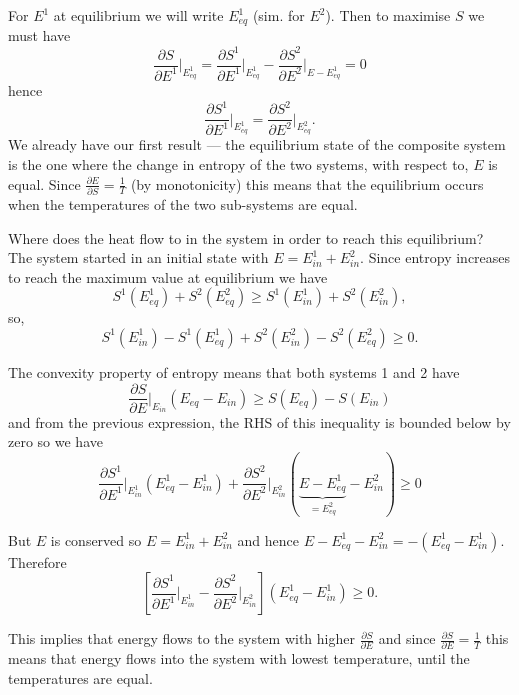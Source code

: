 For $E^1$ at equilibrium we will write $E^1_{eq}$ (sim. for $E^2$). Then to maximise $S$ we must have
$$
	\frac{\partial S}{\partial E^1}\bigg\vert_{E^1_{eq}} = \frac{\partial S^1}{\partial E^1}\bigg\vert_{E^1_{eq}} - \frac{\partial S^2}{\partial E^2}\bigg\vert_{E-E^1_{eq}}=0
$$
hence
$$
	\frac{\partial S^1}{\partial E^1}\vert_{E^1_{eq}} = \frac{\partial S^2}{\partial E^2}\vert_{E_{eq}^2}.
$$ We already have our first result --- the equilibrium state of the composite system is the one where the change in entropy of the two systems, with respect to, $E$ is equal. Since $\frac{\partial E}{\partial S} = \frac{1}{T}$ (by monotonicity) this means that the equilibrium occurs when the temperatures of the two sub-systems are equal.

Where does the heat flow to in the system in order to reach this equilibrium? The system started in an initial state with $E = E^1_{in}+E^2_{in}$. Since entropy increases to reach the maximum  value at equilibrium we have 
$$
	S^1(E^1_{eq}) + S^2(E^2_{eq}) \geq S^1(E^1_{in}) + S^2(E^2_{in}),
$$ 
so,
$$ 
	S^1(E^1_{in}) - S^1(E^1_{eq})  +  S^2(E^2_{in}) - S^2(E^2_{eq})\geq 0.
$$

The convexity property of entropy means that both systems  1 and 2 have 
$$
	\frac{\partial S}{\partial E}\vert_{E_{in}}(E_{eq}-E_{in})\geq S(E_{eq})-S(E_{in})
$$ 
and from the previous expression, the RHS of this inequality is bounded below by zero so we have
$$
	\frac{\partial S^1}{\partial E^1}\bigg\vert_{E^1_{in}}(E_{eq}^1-E_{in}^1) + \frac{\partial S^2}{\partial E^2}\bigg\vert_{E^2_{in}}(\underbrace{E-E_{eq}^1}_{=E^2_{eq}}-E_{in}^2)\geq0
$$

But $E$ is conserved so $E=E^1_{in}+E^2_{in}$ and hence $E-E^1_{eq}-E^2_{in} = -(E^1_{eq}-E^1_{in})$. Therefore
$$
	\left[\frac{\partial S^1}{\partial E^1}\bigg\vert_{E^1_{in}} - \frac{\partial S^2}{\partial E^2}\bigg\vert_{E^2_{in}}\right]\left(E^1_{eq}-E^1_{in}\right)\geq 0.
$$

This implies that energy flows to the  system with higher $\frac{\partial S}{\partial E}$ and since $\frac{\partial S}{\partial E}= \frac{1}{T}$ this means that energy flows into the system with lowest temperature, until the temperatures are equal.

